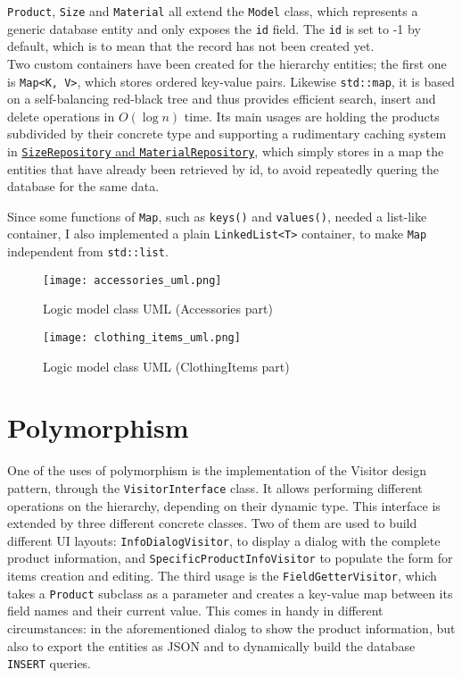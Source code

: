 \documentclass[10pt]{article}
\begin{document}
\texttt{Product},
\texttt{Size} and \texttt{Material} all extend the \texttt{Model} class, which
represents a generic database entity and only exposes the \texttt{id} field.
The \texttt{id} is set to -1 by default, which is to mean that the record has
not been created yet.
\\\linebreak
Two custom containers have been created for the hierarchy entities;
the first one is \texttt{Map<K, V>}, which stores ordered key-value
pairs. Likewise \texttt{std::map}, it is based on a self-balancing red-black
tree and thus provides efficient search, insert and delete operations in $O(\log n)$ time.
Its main usages are holding the products subdivided by their concrete
type and supporting a rudimentary caching system in \hyperref[sec:repositoryPattern]{\texttt{SizeRepository}
    and \texttt{MaterialRepository}}, which simply stores in a map the
entities that have already been retrieved by id, to avoid repeatedly quering
the database for the same data.

Since some functions of \texttt{Map}, such as \texttt{keys()} and
\texttt{values()}, needed a list-like container, I also implemented a plain
\texttt{LinkedList<T>} container, to make \texttt{Map} independent from
\texttt{std::list}.

\begin{figure}
    \centering
    \texttt{[image: accessories\_uml.png]}
    \caption{Logic model class UML (Accessories part)}
    \label{fig:accessoriesUML}
\end{figure}
\begin{figure}
    \centering
    \texttt{[image: clothing\_items\_uml.png]}
    \caption{Logic model class UML (ClothingItems part)}
    \label{fig:clothingItemsUML}
\end{figure}
\pagebreak

\section{Polymorphism}
One of the uses of polymorphism is the implementation of the Visitor design
pattern, through the \texttt{VisitorInterface} class. It allows performing
different operations on the hierarchy, depending on their dynamic type. This
interface is extended by three different concrete classes. Two of them are used
to build different UI layouts: \texttt{InfoDialogVisitor}, to display a dialog
with the complete product information, and \texttt{SpecificProductInfoVisitor}
to populate the form for items creation and editing. The third usage is the
\texttt{FieldGetterVisitor}, which takes a \texttt{Product} subclass as a
parameter and creates a key-value map between its field names and their current
value. This comes in handy in different circumstances: in the aforementioned
dialog to show the product information, but also to export the entities as JSON
and to dynamically build the database \texttt{INSERT} queries.
\end{document}
